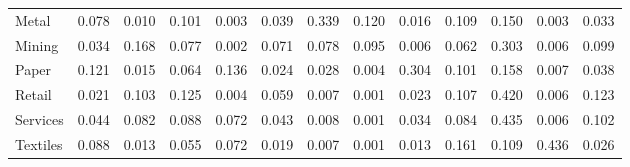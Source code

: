 \begin{table}[htbp]
\begin{tabular}{lcccccccccccc}
  Metal & \textcolor[RGB]{97,63,158}{0.078} & \textcolor[RGB]{195,126,60}{0.010} & \textcolor[RGB]{73,47,182}{0.101} & \textcolor[RGB]{232,150,23}{0.003} & \textcolor[RGB]{133,86,122}{0.039} & \textcolor[RGB]{14,9,241}{0.339} & \textcolor[RGB]{53,34,202}{0.120} & \textcolor[RGB]{181,117,74}{0.016} & \textcolor[RGB]{62,40,193}{0.109} & \textcolor[RGB]{32,21,223}{0.150} & \textcolor[RGB]{230,149,25}{0.003} & \textcolor[RGB]{145,94,110}{0.033} \\ 
  Mining & \textcolor[RGB]{143,93,112}{0.034} & \textcolor[RGB]{27,17,228}{0.168} & \textcolor[RGB]{99,64,156}{0.077} & \textcolor[RGB]{244,158,11}{0.002} & \textcolor[RGB]{104,68,151}{0.071} & \textcolor[RGB]{96,62,159}{0.078} & \textcolor[RGB]{81,53,174}{0.095} & \textcolor[RGB]{220,142,35}{0.006} & \textcolor[RGB]{108,70,147}{0.062} & \textcolor[RGB]{21,14,234}{0.303} & \textcolor[RGB]{218,141,37}{0.006} & \textcolor[RGB]{76,49,179}{0.099} \\ 
  Paper & \textcolor[RGB]{51,33,204}{0.121} & \textcolor[RGB]{182,118,73}{0.015} & \textcolor[RGB]{106,69,149}{0.064} & \textcolor[RGB]{39,25,216}{0.136} & \textcolor[RGB]{166,108,89}{0.024} & \textcolor[RGB]{159,103,96}{0.028} & \textcolor[RGB]{228,148,27}{0.004} & \textcolor[RGB]{19,13,236}{0.304} & \textcolor[RGB]{74,48,181}{0.101} & \textcolor[RGB]{30,19,225}{0.158} & \textcolor[RGB]{209,135,46}{0.007} & \textcolor[RGB]{135,87,120}{0.038} \\ 
  Retail & \textcolor[RGB]{174,112,81}{0.021} & \textcolor[RGB]{67,44,188}{0.103} & \textcolor[RGB]{44,29,211}{0.125} & \textcolor[RGB]{225,146,30}{0.004} & \textcolor[RGB]{112,72,143}{0.059} & \textcolor[RGB]{207,134,48}{0.007} & \textcolor[RGB]{250,162,5}{0.001} & \textcolor[RGB]{170,110,85}{0.023} & \textcolor[RGB]{64,41,191}{0.107} & \textcolor[RGB]{5,3,250}{0.420} & \textcolor[RGB]{214,139,41}{0.006} & \textcolor[RGB]{48,31,207}{0.123} \\ 
  Services & \textcolor[RGB]{124,80,131}{0.044} & \textcolor[RGB]{92,60,163}{0.082} & \textcolor[RGB]{83,54,172}{0.088} & \textcolor[RGB]{101,65,154}{0.072} & \textcolor[RGB]{126,81,129}{0.043} & \textcolor[RGB]{200,129,55}{0.008} & \textcolor[RGB]{251,163,4}{0.001} & \textcolor[RGB]{142,92,113}{0.034} & \textcolor[RGB]{89,57,166}{0.084} & \textcolor[RGB]{4,2,251}{0.435} & \textcolor[RGB]{212,138,42}{0.006} & \textcolor[RGB]{69,45,186}{0.102} \\ 
  Textiles & \textcolor[RGB]{85,55,170}{0.088} & \textcolor[RGB]{188,121,67}{0.013} & \textcolor[RGB]{115,74,140}{0.055} & \textcolor[RGB]{103,66,152}{0.072} & \textcolor[RGB]{175,113,80}{0.019} & \textcolor[RGB]{205,133,50}{0.007} & \textcolor[RGB]{248,160,7}{0.001} & \textcolor[RGB]{186,120,69}{0.013} & \textcolor[RGB]{28,18,227}{0.161} & \textcolor[RGB]{60,39,195}{0.109} & \textcolor[RGB]{2,1,253}{0.436} & \textcolor[RGB]{163,105,92}{0.026} \\ 

\end{tabular}
\end{table}
